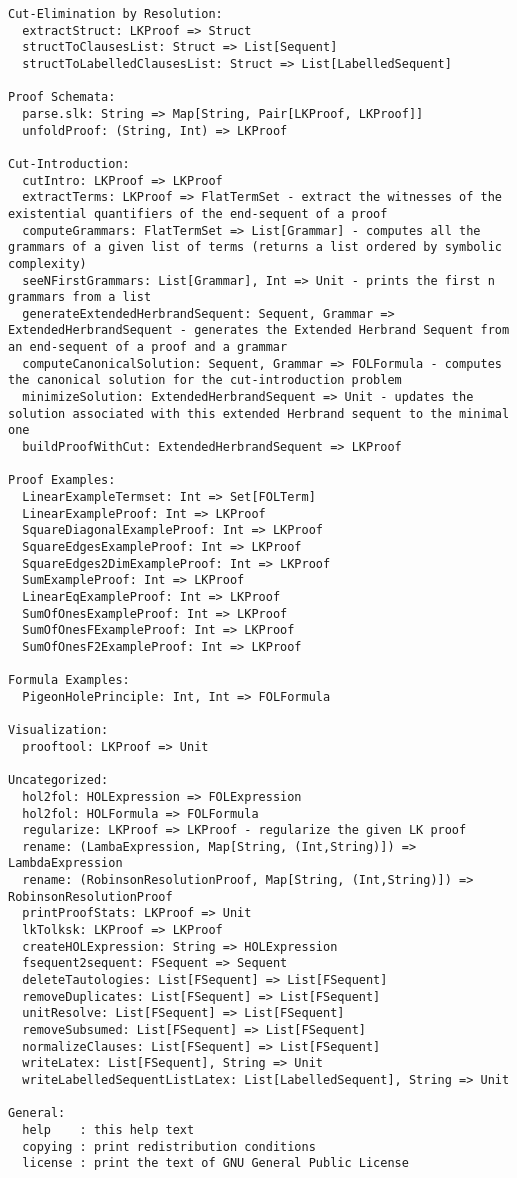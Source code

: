 \documentclass[a4paper, 11pt]{report}
\begin{document}
\begin{lstlisting}
Cut-Elimination by Resolution:
  extractStruct: LKProof => Struct
  structToClausesList: Struct => List[Sequent]
  structToLabelledClausesList: Struct => List[LabelledSequent]

Proof Schemata:
  parse.slk: String => Map[String, Pair[LKProof, LKProof]]
  unfoldProof: (String, Int) => LKProof

Cut-Introduction:
  cutIntro: LKProof => LKProof
  extractTerms: LKProof => FlatTermSet - extract the witnesses of the existential quantifiers of the end-sequent of a proof
  computeGrammars: FlatTermSet => List[Grammar] - computes all the grammars of a given list of terms (returns a list ordered by symbolic complexity)
  seeNFirstGrammars: List[Grammar], Int => Unit - prints the first n grammars from a list
  generateExtendedHerbrandSequent: Sequent, Grammar => ExtendedHerbrandSequent - generates the Extended Herbrand Sequent from an end-sequent of a proof and a grammar
  computeCanonicalSolution: Sequent, Grammar => FOLFormula - computes the canonical solution for the cut-introduction problem
  minimizeSolution: ExtendedHerbrandSequent => Unit - updates the solution associated with this extended Herbrand sequent to the minimal one
  buildProofWithCut: ExtendedHerbrandSequent => LKProof 

Proof Examples:
  LinearExampleTermset: Int => Set[FOLTerm] 
  LinearExampleProof: Int => LKProof 
  SquareDiagonalExampleProof: Int => LKProof 
  SquareEdgesExampleProof: Int => LKProof 
  SquareEdges2DimExampleProof: Int => LKProof 
  SumExampleProof: Int => LKProof 
  LinearEqExampleProof: Int => LKProof 
  SumOfOnesExampleProof: Int => LKProof 
  SumOfOnesFExampleProof: Int => LKProof 
  SumOfOnesF2ExampleProof: Int => LKProof

Formula Examples:
  PigeonHolePrinciple: Int, Int => FOLFormula

Visualization:
  prooftool: LKProof => Unit

Uncategorized:
  hol2fol: HOLExpression => FOLExpression
  hol2fol: HOLFormula => FOLFormula
  regularize: LKProof => LKProof - regularize the given LK proof
  rename: (LambaExpression, Map[String, (Int,String)]) => LambdaExpression
  rename: (RobinsonResolutionProof, Map[String, (Int,String)]) => RobinsonResolutionProof
  printProofStats: LKProof => Unit
  lkTolksk: LKProof => LKProof
  createHOLExpression: String => HOLExpression
  fsequent2sequent: FSequent => Sequent
  deleteTautologies: List[FSequent] => List[FSequent]
  removeDuplicates: List[FSequent] => List[FSequent]
  unitResolve: List[FSequent] => List[FSequent]
  removeSubsumed: List[FSequent] => List[FSequent]
  normalizeClauses: List[FSequent] => List[FSequent]
  writeLatex: List[FSequent], String => Unit
  writeLabelledSequentListLatex: List[LabelledSequent], String => Unit

General:
  help    : this help text
  copying : print redistribution conditions
  license : print the text of GNU General Public License
\end{lstlisting}
\end{document}
